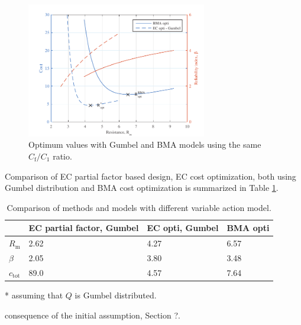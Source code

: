 \begin{figure}[htbp!] 
	\centering    
	\includegraphics[width=0.7\textwidth]{cost_opti_compare_ec_bma.pdf}
	\caption{Optimum values with Gumbel and BMA models using the same ${C_{\mathrm{f}}}/{C_1}$ ratio.}
	\label{fig:cost_opti_ec_bma}
\end{figure}

Comparison of EC partial factor based design, EC cost optimization, both using Gumbel distribution and BMA cost optimization is summarized in Table \ref{tab:cost_opti_comp}.

\begin{table}
\caption{Comparison of methods and models with different variable action model.}
\centering
\label{tab:cost_opti_comp}
\small
	\begin{threeparttable}
	\begin{tabular}{m{1cm} m{3cm} m{3cm} m{3cm}}
		\toprule
		  & EC partial factor, Gumbel  & EC opti, Gumbel & BMA opti \\
		\midrule
		$R_\mathrm{m}$ & 2.62 & 4.27 & 6.57  \\
		
		$\beta$ & 2.05\tnote{*} & 3.80\tnote{\textdagger} & 3.48 \\
		
		$c_\mathrm{tot}$ & 89.0 & 4.57 &  7.64 \\
		\bottomrule
	\end{tabular}
	\begin{tablenotes}
	    \item[*] assuming that $Q$ is Gumbel distributed.
	    \item[\textdagger] consequence of the initial assumption, Section ?.
	\end{tablenotes}
	\end{threeparttable}
\end{table}

